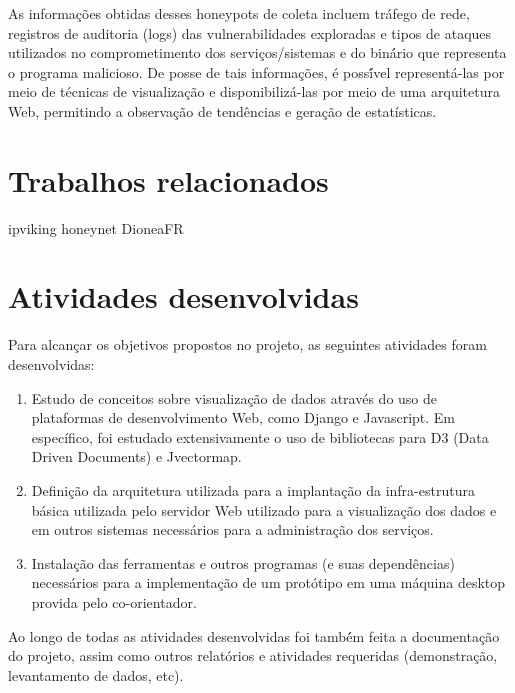 \documentclass[%
        Portuguese,%
        ]
{ic-tese-v2}
\begin{document}
As informações obtidas desses honeypots de coleta incluem tráfego de rede, registros de auditoria (logs) das vulnerabilidades exploradas e tipos de ataques utilizados no comprometimento dos serviços/sistemas e do biná́rio que representa o programa malicioso. De posse de tais informações, é possí́vel representá-las por meio de técnicas de visualização e disponibilizá-las por meio de uma arquitetura Web, permitindo a observação de tendências e geração de estatísticas.


\chapter{Trabalhos relacionados}
ipviking
honeynet
DioneaFR


\chapter{Atividades desenvolvidas}
Para alcançar os objetivos propostos no projeto, as seguintes atividades foram desenvolvidas:

\begin{enumerate}
\item Estudo de conceitos sobre visualização de dados através do uso de plataformas de desenvolvimento Web, como Django e Javascript. Em específico, foi estudado extensivamente o uso de bibliotecas para D3 (Data Driven Documents) e Jvectormap.\\
\item Definição da arquitetura utilizada para a implantação da infra-estrutura básica utilizada pelo servidor Web utilizado para a visualização dos dados e em outros sistemas necessários para a administração dos serviços.\\
\item Instalação das ferramentas e outros programas (e suas dependências) necessários para a implementação de um protótipo em uma máquina desktop provida pelo co-orientador.\\
\end{enumerate}

Ao longo de todas as atividades desenvolvidas foi també́m feita a documentação do projeto, assim como outros relatórios e atividades requeridas (demonstração, levantamento de dados, etc).
\end{document}
